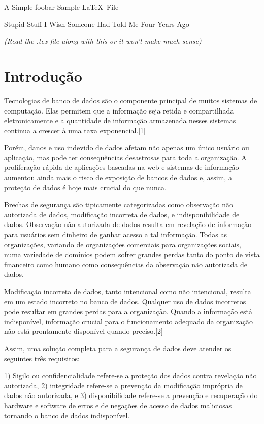 \documentclass{article}
\begin{document}
\centerline{\sc \large A Simple foobar Sample \LaTeX\ File}
\vspace{.5pc}
\centerline{\sc Stupid Stuff I Wish Someone Had Told Me Four Years Ago}
\centerline{\it (Read the .tex file along with this or it won't 
            make much sense)}
\vspace{2pc}


\section{Introdução}

Tecnologias de banco de dados são o componente principal de muitos sistemas de computação. Elas permitem que a informação seja retida e compartilhada eletronicamente e a quantidade de informação armazenada nesses sistemas continua a crescer à uma taxa exponencial.[1]

Porém, danos e uso indevido de dados afetam não apenas um único usuário ou aplicação, mas pode ter consequências desastrosas para toda a organização. A proliferação rápida de aplicações baseadas na web e sistemas de informação aumentou ainda mais o risco de exposição de bancos de dados e, assim, a proteção de dados é hoje mais crucial do que nunca.

Brechas de segurança são tipicamente categorizadas como observação não autorizada de dados, modificação incorreta de dados, e indisponibilidade de dados.  Observação não autorizada de dados resulta em revelação de informação para usuários sem dinheiro de ganhar acesso a tal informação. Todas as organizações, variando de organizações comerciais para organizações sociais, numa variedade de domínios podem sofrer grandes perdas tanto do ponto de vista financeiro como humano como consequências da observação não autorizada de dados.

Modificação incorreta de dados, tanto intencional como não intencional, resulta em um estado incorreto no banco de dados. Qualquer uso de dados incorretos pode resultar em grandes perdas para a organização. Quando a informação está indisponível, informação crucial para o funcionamento adequado da organização não está prontamente disponível quando preciso.[2]

Assim, uma solução completa para a segurança de dados deve atender os seguintes três requisitos:

1)	Sigilo ou confidencialidade refere-se a proteção dos dados contra revelação não autorizada, 2) integridade refere-se a prevenção da modificação imprópria de dados não autorizada, e 3) disponibilidade refere-se a prevenção e recuperação do hardware e software de erros e de negações de acesso de dados maliciosas tornando o banco de dados indisponível.
\end{document}
